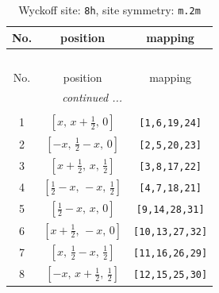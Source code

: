 \documentclass[fleqn,8pt]{jsarticle}
\begin{document}
\begin{longtable}{ccc}
\caption{Wyckoff site: {\tt 8h}, site symmetry: {\tt m.2m}}
 \\
 \hline \hline
No. & position & mapping \\ \hline \endfirsthead

\multicolumn{2}{l}{\tablename\ \thetable{}} \\
 \hline \hline
No. & position & mapping \\ \hline \endhead

 \hline \hline
\multicolumn{2}{r}{\footnotesize\it continued ...} \\ \endfoot

 \hline \hline
\multicolumn{2}{r}{} \\ \endlastfoot

1 & $\left[ x,\, x + \frac{1}{2},\, 0 \right]$ & {\tt [1,6,19,24]} \\ \hline
2 & $\left[ - x,\, \frac{1}{2} - x,\, 0 \right]$ & {\tt [2,5,20,23]} \\ \hline
3 & $\left[ x + \frac{1}{2},\, x,\, \frac{1}{2} \right]$ & {\tt [3,8,17,22]} \\ \hline
4 & $\left[ \frac{1}{2} - x,\, - x,\, \frac{1}{2} \right]$ & {\tt [4,7,18,21]} \\ \hline
5 & $\left[ \frac{1}{2} - x,\, x,\, 0 \right]$ & {\tt [9,14,28,31]} \\ \hline
6 & $\left[ x + \frac{1}{2},\, - x,\, 0 \right]$ & {\tt [10,13,27,32]} \\ \hline
7 & $\left[ x,\, \frac{1}{2} - x,\, \frac{1}{2} \right]$ & {\tt [11,16,26,29]} \\ \hline
8 & $\left[ - x,\, x + \frac{1}{2},\, \frac{1}{2} \right]$ & {\tt [12,15,25,30]} \\
\end{longtable}
\renewcommand{\arraystretch}{1.2}
\end{document}
